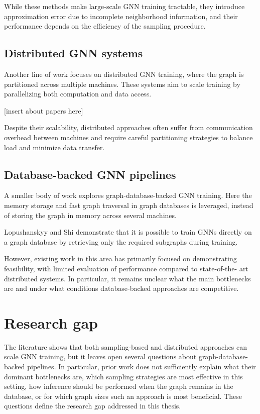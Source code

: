 \documentclass[PhD]{uclathes}
\begin{document}
While these methods make large-scale GNN training tractable, they introduce
approximation error due to incomplete neighborhood information, and their
performance depends on the efficiency of the sampling procedure.

\subsection{Distributed GNN systems}
Another line of work focuses on distributed GNN training, where the graph is
partitioned across multiple machines. These systems aim to scale training by
parallelizing both computation and data access.

[insert about papers here]

Despite their scalability, distributed approaches often suffer from
communication overhead between machines and require careful partitioning
strategies to balance load and minimize data transfer.

\subsection{Database-backed GNN pipelines}
A smaller body of work explores graph-database-backed GNN training. Here the
memory storage and fast graph traversal in graph databases is leveraged,
instead of storing the graph in memory across several machines.

Lopushanskyy and Shi demonstrate that it is possible to train GNNs directly on a
graph database by retrieving only the required subgraphs during training.

However, existing work in this area has primarily focused on demonstrating
feasibility, with limited evaluation of performance compared to state-of-the-
art distributed systems. In particular, it remains unclear what the main
bottlenecks are and under what conditions database-backed approaches are
competitive.

\section{Research gap}
The literature shows that both sampling-based and distributed approaches can
scale GNN training, but it leaves open several questions about graph-database-
backed pipelines. In particular, prior work does not sufficiently explain what
their dominant bottlenecks are, which sampling strategies are most effective in
this setting, how inference should be performed when the graph remains in the
database, or for which graph sizes such an approach is most beneficial. These
questions define the research gap addressed in this thesis.
\end{document}
